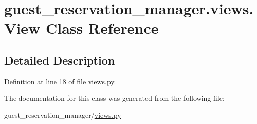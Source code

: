 \hypertarget{classguest__reservation__manager_1_1views_1_1View}{\section{guest\-\_\-reservation\-\_\-manager.\-views.\-View Class Reference}
\label{classguest__reservation__manager_1_1views_1_1View}
}


\subsection{Detailed Description}


Definition at line 18 of file views.\-py.



The documentation for this class was generated from the following file\-:\begin{DoxyCompactItemize}
\item 
guest\-\_\-reservation\-\_\-manager/\hyperlink{guest__reservation__manager_2views_8py}{views.\-py}\end{DoxyCompactItemize}

